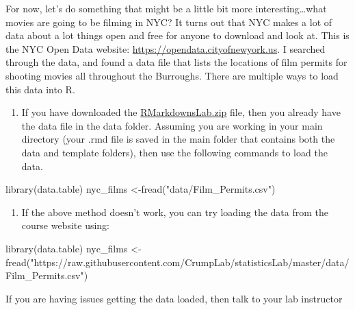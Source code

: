\documentclass[
]{book}
\newenvironment{Shaded}{\begin{snugshade}}{\end{snugshade}}
\newcommand{\FunctionTok}[1]{\textcolor[rgb]{0.00,0.00,0.00}{#1}}
\newcommand{\NormalTok}[1]{#1}
\newcommand{\OtherTok}[1]{\textcolor[rgb]{0.56,0.35,0.01}{#1}}
\newcommand{\StringTok}[1]{\textcolor[rgb]{0.31,0.60,0.02}{#1}}
\providecommand{\tightlist}{%
  \setlength{\itemsep}{0pt}\setlength{\parskip}{0pt}}
\begin{document}
For now, let's do something that might be a little bit more interesting\ldots what movies are going to be filming in NYC? It turns out that NYC makes a lot of data about a lot things open and free for anyone to download and look at. This is the NYC Open Data website: \url{https://opendata.cityofnewyork.us}. I searched through the data, and found a data file that lists the locations of film permits for shooting movies all throughout the Burroughs. There are multiple ways to load this data into R.

\begin{enumerate}
\def\labelenumi{\arabic{enumi}.}
\tightlist
\item
  If you have downloaded the \href{https://github.com/CrumpLab/statisticsLab/raw/master/RMarkdownsLab.zip}{RMarkdownsLab.zip} file, then you already have the data file in the data folder. Assuming you are working in your main directory (your .rmd file is saved in the main folder that contains both the data and template folders), then use the following commands to load the data.
\end{enumerate}

\begin{Shaded}
\begin{Highlighting}[]
\FunctionTok{library}\NormalTok{(data.table)}
\NormalTok{nyc\_films }\OtherTok{\textless{}{-}}\FunctionTok{fread}\NormalTok{(}\StringTok{"data/Film\_Permits.csv"}\NormalTok{)}
\end{Highlighting}
\end{Shaded}

\begin{enumerate}
\def\labelenumi{\arabic{enumi}.}
\setcounter{enumi}{1}
\tightlist
\item
  If the above method doesn't work, you can try loading the data from the course website using:
\end{enumerate}

\begin{Shaded}
\begin{Highlighting}[]
\FunctionTok{library}\NormalTok{(data.table)}
\NormalTok{nyc\_films }\OtherTok{\textless{}{-}} \FunctionTok{fread}\NormalTok{(}\StringTok{"https://raw.githubusercontent.com/CrumpLab/statisticsLab/master/data/Film\_Permits.csv"}\NormalTok{)}
\end{Highlighting}
\end{Shaded}

If you are having issues getting the data loaded, then talk to your lab instructor
\end{document}
